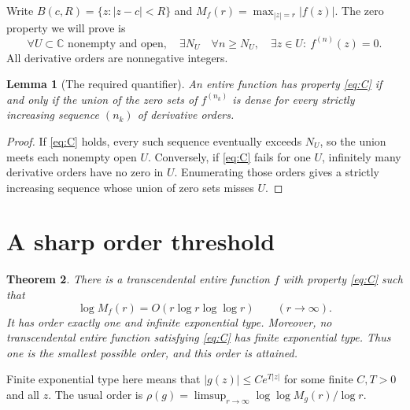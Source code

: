 \documentclass[11pt]{article}
\newtheorem{theorem}{Theorem}
\newtheorem{lemma}[theorem]{Lemma}
\theoremstyle{remark}
\newcommand{\C}{\mathbb C}
\begin{document}
Write $B(c,R)=\{z:|z-c|<R\}$ and
$M_f(r)=\max_{|z|=r}|f(z)|$. The zero property we will prove is
\begin{equation}\tag{C}\label{eq:C}
 \forall U\subset\C\text{ nonempty and open},\quad
 \exists N_U\quad\forall n\geq N_U,\quad
 \exists z\in U:\ f^{(n)}(z)=0.
\end{equation}
All derivative orders are nonnegative integers.

\begin{lemma}[The required quantifier]
An entire function has property \eqref{eq:C} if and only if the union of
the zero sets of $f^{(n_k)}$ is dense for every strictly increasing
sequence $(n_k)$ of derivative orders.
\end{lemma}
\begin{proof}
If \eqref{eq:C} holds, every such sequence eventually exceeds $N_U$, so
the union meets each nonempty open $U$. Conversely, if \eqref{eq:C}
fails for one $U$, infinitely many derivative orders have no zero in
$U$. Enumerating those orders gives a strictly increasing sequence
whose union of zero sets misses $U$.
\end{proof}

\section{A sharp order threshold}

\begin{theorem}\label{thm:main}
There is a transcendental entire function $f$ with property
\eqref{eq:C} such that
\begin{equation}\label{eq:growth}
 \log M_f(r)=O(r\log r\log\log r)\qquad(r\longrightarrow\infty).
\end{equation}
It has order exactly one and infinite exponential type.
Moreover, no transcendental entire function satisfying
\eqref{eq:C} has finite exponential type. Thus one is the smallest
possible order, and this order is attained.
\end{theorem}

Finite exponential type here means that
$|g(z)|\leq C e^{T|z|}$ for some finite $C,T>0$ and all $z$.
The usual order is
$\rho(g)=\limsup_{r\to\infty}\log\log M_g(r)/\log r$.
\end{document}
